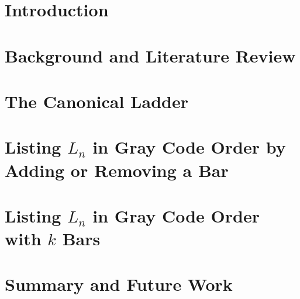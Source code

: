 



\chapter{Introduction}
\label{chapter:intro}









\chapter{Background and Literature Review}
\label{chapter:Background}



\chapter{The Canonical Ladder}  
\label{chapter:listingproblem}

\chapter{Listing $L_{n}$ in Gray Code Order by Adding or Removing a Bar} 

\chapter{Listing $L_{n}$ in Gray Code Order with $k$ Bars}

\chapter{Summary and Future Work}



% 
% 
% 
% 



\label{chapter:evaluation}





